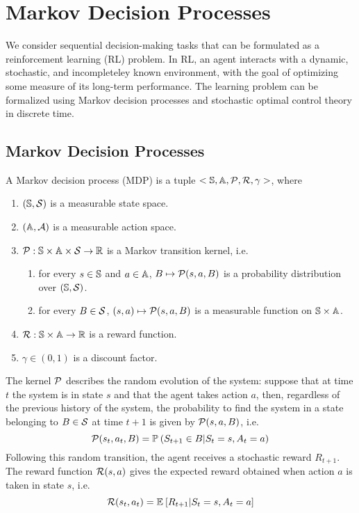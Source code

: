 \chapter{Markov Decision Processes}

We consider sequential decision-making tasks that can be formulated as a
reinforcement learning (RL) problem. In RL, an agent interacts with a dynamic,
stochastic, and incompleteley known environment, with the goal of optimizing
some measure of its long-term performance. The learning problem can be 
formalized using Markov decision processes and stochastic optimal control 
theory in discrete time.

\section{Markov Decision Processes}
\begin{definition}
	A Markov decision process (MDP) is a tuple $<\S, \A, \calP, \calR,
	\gamma>$, where
	\begin{enumerate}[label={\roman*)}]
		\item $(\S, \calS)$ is a measurable state space.
		\item $(\A, \calA)$ is a measurable action space. 
		\item $\calP: \S \times \A \times \calS \to \R$ is a Markov transition
			kernel, i.e.
			\begin{enumerate}[label={\alph*)}]
				\item for every $s\in\S$ and $a\in\A$, $B \mapsto \calP(s,a,B)$
					  is a probability distribution over $(\S, \calS)$.
				\item for every $B\in\calS$, $(s,a) \mapsto \calP(s,a,B)$ is
					  a measurable function on $\S \times \A$.
			\end{enumerate}
		\item $\calR: \S \times \A \to \R$ is a reward function.
		\item $\gamma \in (0,1)$ is a discount factor.
	\end{enumerate}
\end{definition}
The kernel $\calP$ describes the random evolution of the system: suppose that
at time $t$ the system is in state $s$ and that the agent takes action $a$,
then, regardless of the previous history of the system, the probability to find
the system in a state belonging to $B\in\calS$ at time $t+1$ is given by
$\calP(s, a, B)$, i.e.
\begin{equation}
	\calP(s_t, a_t, B) = \P{S_{t+1} \in B | S_t = s, A_t = a}
\end{equation}
Following this random transition, the agent receives a stochastic reward
$R_{t+1}$. The reward function $\calR(s, a)$ gives the expected reward
obtained when action $a$ is taken in state $s$, i.e. 
\begin{equation}
	\calR(s_t, a_t) = \E{R_{t+1} | S_t = s, A_t = a}
\end{equation}

